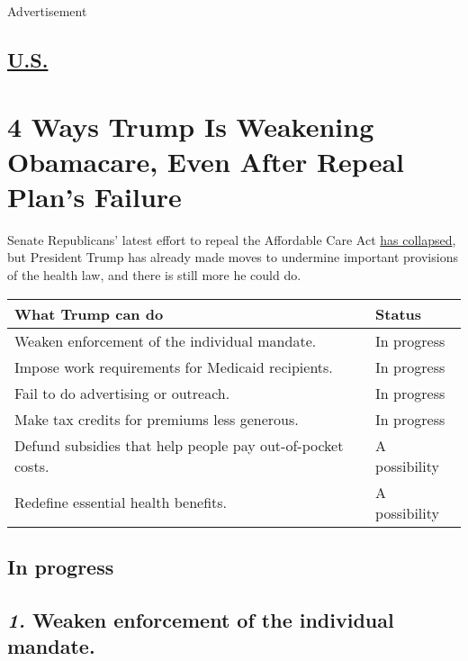 Advertisement

\hypertarget{-us-}{%
\subsection{\texorpdfstring{
\href{https://www.nytimes.com/section/us}{U.S.} }{ U.S. }}\label{-us-}}

\hypertarget{4-ways-trump-is-weakening-obamacare-even-after-repeal-plans-failure}{%
\section{4 Ways Trump Is Weakening Obamacare, Even After Repeal Plan's
Failure}\label{4-ways-trump-is-weakening-obamacare-even-after-repeal-plans-failure}}

Senate Republicans' latest effort to repeal the Affordable Care Act
\href{https://www.nytimes.com/interactive/2017/09/25/us/republicans-who-opposed-the-senate-health-care-bills.html}{has
collapsed}, but President Trump has already made moves to undermine
important provisions of the health law, and there is still more he could
do.

\begin{longtable}[]{@{}ll@{}}
\toprule
\textbf{What Trump can do} & \textbf{Status}\tabularnewline
\midrule
\endhead
Weaken enforcement of the individual mandate. & In
progress\tabularnewline
Impose work requirements for Medicaid recipients. & In
progress\tabularnewline
Fail to do advertising or outreach. & In progress\tabularnewline
Make tax credits for premiums less generous. & In
progress\tabularnewline
Defund subsidies that help people pay out-of-pocket costs. & A
possibility\tabularnewline
Redefine essential health benefits. & A possibility\tabularnewline
\bottomrule
\end{longtable}

\hypertarget{in-progress}{%
\subsection{In progress}\label{in-progress}}

\hypertarget{1-weaken-enforcement-of-the-individual-mandate}{%
\subsection{\texorpdfstring{\emph{\textbf{1.}} \textbf{Weaken
enforcement of the individual
mandate.}}{1. Weaken enforcement of the individual mandate.}}\label{1-weaken-enforcement-of-the-individual-mandate}}

